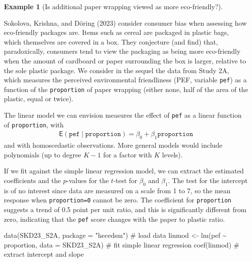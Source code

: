 \documentclass[
  11pt,
  letterpaper,
]{scrbook}
\newenvironment{Shaded}{\begin{snugshade}}{\end{snugshade}}
\newcommand{\AttributeTok}[1]{\textcolor[rgb]{0.40,0.45,0.13}{#1}}
\newcommand{\CommentTok}[1]{\textcolor[rgb]{0.37,0.37,0.37}{#1}}
\newcommand{\FunctionTok}[1]{\textcolor[rgb]{0.28,0.35,0.67}{#1}}
\newcommand{\NormalTok}[1]{\textcolor[rgb]{0.00,0.23,0.31}{#1}}
\newcommand{\OtherTok}[1]{\textcolor[rgb]{0.00,0.23,0.31}{#1}}
\newcommand{\SpecialCharTok}[1]{\textcolor[rgb]{0.37,0.37,0.37}{#1}}
\newcommand{\StringTok}[1]{\textcolor[rgb]{0.13,0.47,0.30}{#1}}
\theoremstyle{definition}
\theoremstyle{definition}
\newtheorem{example}{Example}[chapter]
\theoremstyle{remark}
\begin{document}
\begin{example}[Is additional paper wrapping viewed as more
eco-friendly?]\protect\hypertarget{exm-sokolova}{}\label{exm-sokolova}

Sokolova, Krishna, and Döring (2023) consider consumer bias when
assessing how eco-friendly packages are. Items such as cereal are
packaged in plastic bags, which themselves are covered in a box. They
conjecture (and find) that, paradoxically, consumers tend to view the
packaging as being more eco-friendly when the amount of cardboard or
paper surrounding the box is larger, relative to the sole plastic
package. We consider in the sequel the data from Study 2A, which
measures the perceived environmental friendliness (PEF, variable
\texttt{pef}) as a function of the \texttt{proportion} of paper wrapping
(either none, half of the area of the plastic, equal or twice).

The linear model we can envision measures the effect of \texttt{pef} as
a linear function of \texttt{proportion}, with \begin{align*}
\mathsf{E}(\texttt{pef} \mid \texttt{proportion}) = \beta_0 + \beta_1 \texttt{proportion}
\end{align*} and with homoscedastic observations. More general models
would include polynomials (up to degree \(K-1\) for a factor with \(K\)
levels).

If we fit against the simple linear regression model, we can extract the
estimated coefficients and the \(p\)-values for the \(t\)-test for
\(\beta_0\) and \(\beta_1\). The test for the intercept is of no
interest since data are measured on a scale from 1 to 7, so the mean
response when \texttt{proportion=0} cannot be zero. The coefficient for
\texttt{proportion} suggests a trend of 0.5 point per unit ratio, and
this is significantly different from zero, indicating that the
\texttt{pef} score changes with the paper to plastic ratio.

\begin{Shaded}
\begin{Highlighting}[]
\FunctionTok{data}\NormalTok{(SKD23\_S2A, }\AttributeTok{package =} \StringTok{"hecedsm"}\NormalTok{) }\CommentTok{\# load data}
\NormalTok{linmod }\OtherTok{\textless{}{-}} \FunctionTok{lm}\NormalTok{(pef }\SpecialCharTok{\textasciitilde{}}\NormalTok{ proportion, }\AttributeTok{data =}\NormalTok{ SKD23\_S2A)}
\CommentTok{\# fit simple linear regression}
\FunctionTok{coef}\NormalTok{(linmod) }\CommentTok{\# extract intercept and slope}
\end{Highlighting}
\end{Shaded}


\end{example}
\end{document}
